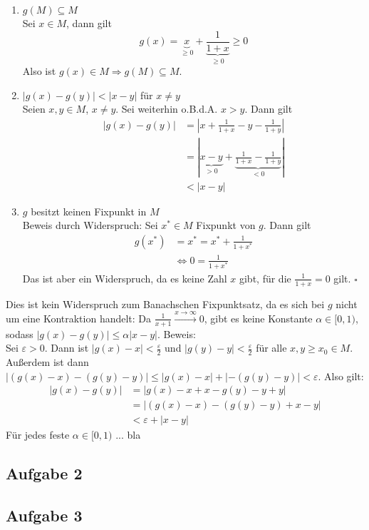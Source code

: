 \documentclass[11pt,a4paper,ngerman]{article}
\begin{document}
\begin{enumerate}
\item $g(M) \subseteq M$\\
  Sei $x \in M$, dann gilt 
  \begin{equation*}
    g(x) = \underbrace{x}_{\geq 0} + \underbrace{\frac{1}{1+x}}_{\geq 0} \geq 0
  \end{equation*}
  Also ist $g(x) \in M \Rightarrow g(M) \subseteq M$.
\item $|g(x) - g(y)| < |x-y|$ für $x \neq y$\\
  Seien $x,y \in M$, $x \neq y$. Sei weiterhin o.B.d.A. $x > y$. Dann gilt
  \begin{equation*}\begin{split}
    |g(x) - g(y)| &= |x + \frac{1}{1+x} - y - \frac{1}{1+y}|\\
                  &= |\underbrace{x - y}_{> 0} + \underbrace{\frac{1}{1+x} - \frac{1}{1+y}}_{< 0}| \\
                  &< |x - y|
  \end{split}\end{equation*}
\item $g$ besitzt keinen Fixpunkt in $M$\\
  Beweis durch Widerspruch: Sei $x^* \in M$ Fixpunkt von $g$. Dann gilt
  \begin{equation*}\begin{split}
    g(x^*) &= x^* = x^* + \frac{1}{1+ x^*}\\
    &\Leftrightarrow 0 = \frac{1}{1 + x^*}
  \end{split}\end{equation*}
  Das ist aber ein Widerspruch, da es keine Zahl $x$ gibt, für die $\frac{1}{1+x} = 0$ gilt.
  \mbox{} \hfill $\square$
\end{enumerate}
Dies ist kein Widerspruch zum Banachschen Fixpunktsatz, da es sich bei $g$ nicht um eine
Kontraktion handelt: Da $\frac{1}{x+1} \stackrel{x \to \infty}{\to} 0$, gibt es keine Konstante
$\alpha \in [0,1)$, sodass  $|g(x) - g(y)| \leq \alpha|x-y|$. Beweis:\\
Sei $\varepsilon > 0$.
Dann ist $|g(x) - x| < \frac{\varepsilon}{2}$ und $|g(y) - y| < \frac{\varepsilon}{2}$ für alle 
$x,y \geq x_0 \in M$. Außerdem ist dann 
$|(g(x) - x) - (g(y) - y)| \leq |g(x)-x| + |-(g(y)-y)| < \varepsilon$. 
Also gilt:
\begin{equation*}\begin{split}
|g(x) - g(y)| &= |g(x) - x + x - g(y) - y + y| \\
              &= |(g(x) - x) - (g(y) - y) + x - y| \\
              &< \varepsilon + |x-y|
\end{split}\end{equation*}
Für jedes feste $\alpha \in [0,1)$ ... bla

\subsection*{Aufgabe 2}

\subsection*{Aufgabe 3}

\label{LastPage}
\end{document}
